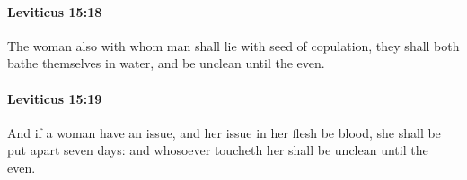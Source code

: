 		\paragraph{Leviticus 15:18} %
			\label{LEVITICUS-15-18}

			The woman also with whom man shall lie with seed of copulation, they shall both bathe themselves in water, and be unclean until the even.


		\paragraph{Leviticus 15:19} %
			\label{LEVITICUS-15-19}

			And if a woman have an issue, and her issue in her flesh be blood, she shall be put apart seven days: and whosoever toucheth her shall be unclean until the even.


